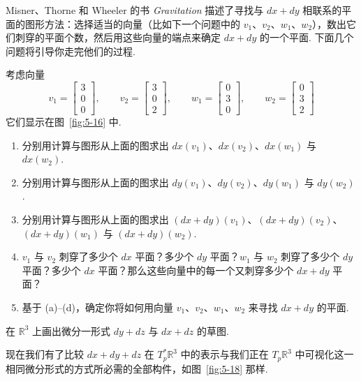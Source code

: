 Misner、Thorne 和 Wheeler 的书 \textit{Gravitation} 描述了寻找与 $dx+dy$ 相联系的平面的图形方法：选择适当的向量（比如下一个问题中的 $v_1$、$v_2$、$w_1$、$w_2$），数出它们刺穿的平面个数，然后用这些向量的端点来确定 $dx+dy$ 的一个平面. 下面几个问题将引导你走完他们的过程.

\begin{question}\label{q:5-10}
考虑向量
\[
v_1=\begin{bmatrix}3\\0\\0\end{bmatrix},\qquad
v_2=\begin{bmatrix}3\\0\\2\end{bmatrix},\qquad
w_1=\begin{bmatrix}0\\3\\0\end{bmatrix},\qquad
w_2=\begin{bmatrix}0\\3\\2\end{bmatrix}
\]
它们显示在图~\ref{fig:5-16} 中.
\begin{enumerate}
  \item[(a)] 分别用计算与图形从上面的图求出 $dx(v_1)$、$dx(v_2)$、$dx(w_1)$ 与 $dx(w_2)$.
  \item[(b)] 分别用计算与图形从上面的图求出 $dy(v_1)$、$dy(v_2)$、$dy(w_1)$ 与 $dy(w_2)$.
  \item[(c)] 分别用计算与图形从上面的图求出 $(dx+dy)(v_1)$、$(dx+dy)(v_2)$、$(dx+dy)(w_1)$ 与 $(dx+dy)(w_2)$.
  \item[(d)] $v_1$ 与 $v_2$ 刺穿了多少个 $dx$ 平面？多少个 $dy$ 平面？$w_1$ 与 $w_2$ 刺穿了多少个 $dy$ 平面？多少个 $dx$ 平面？那么这些向量中的每一个又刺穿多少个 $dx+dy$ 平面？
  \item[(e)] 基于 (a)--(d)，确定你将如何用向量 $v_1$、$v_2$、$w_1$、$w_2$ 来寻找 $dx+dy$ 的平面.
\end{enumerate}
\end{question}

\begin{question}\label{q:5-11}
在 $\mathbb{R}^3$ 上画出微分一形式 $dy+dz$ 与 $dx+dz$ 的草图.
\end{question}

现在我们有了比较 $dx+dy+dz$ 在 $T_p^*\mathbb{R}^3$ 中的表示与我们正在 $T_p\mathbb{R}^3$ 中可视化这一相同微分形式的方式所必需的全部构件，如图~\ref{fig:5-18} 那样.

